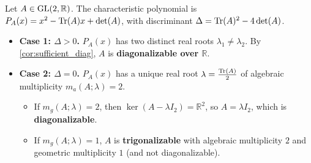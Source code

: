 \begin{exercisesolution}
\label{sol:real_2x2_similarity_classification}
Let $A \in \operatorname{GL}(2, \mathbb{R})$. The characteristic polynomial is $P_A(x) = x^2 - \operatorname{Tr}(A)x + \det(A)$, with discriminant $\Delta = \operatorname{Tr}(A)^2 - 4\det(A)$.
\begin{itemize}
    \item \textbf{Case 1: $\Delta > 0$.}
    $P_A(x)$ has two distinct real roots $\lambda_1 \ne \lambda_2$. By \cref{cor:sufficient_diag}, $A$ is \textbf{diagonalizable over $\mathbb{R}$}.

    \item \textbf{Case 2: $\Delta = 0$.}
    $P_A(x)$ has a unique real root $\lambda = \frac{\operatorname{Tr}(A)}{2}$ of algebraic multiplicity $m_a(A; \lambda) = 2$.
    \begin{itemize}
        \item If $m_g(A; \lambda) = 2$, then $\ker(A - \lambda I_2) = \mathbb{R}^2$, so $A = \lambda I_2$, which is \textbf{diagonalizable}.
        \item If $m_g(A; \lambda) = 1$, $A$ is \textbf{trigonalizable} with algebraic multiplicity $2$ and geometric multiplicity $1$ (and not diagonalizable).
    \end{itemize}


\end{itemize}
\end{exercisesolution}
